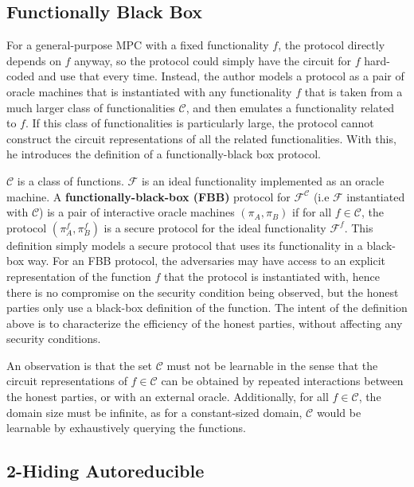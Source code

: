\documentclass[11pt]{article}
\theoremstyle{theorem}
\theoremstyle{theorem}
\theoremstyle{remark}
\theoremstyle{note}
\theoremstyle{plain}
\theoremstyle{definition}
\begin{document}
\subsection{Functionally Black Box}
For a general-purpose MPC with a fixed functionality $f$, the protocol directly depends on $f$ anyway, so the protocol could simply have the circuit for $f$ hard-coded and use that every time. Instead, the author models a protocol as a pair of oracle machines that is instantiated with any functionality $f$ that is taken from a much larger class of functionalities $\mathcal{C}$, and then emulates a functionality related to $f$. If this class of functionalities is particularly large, the protocol cannot construct the circuit representations of all the related functionalities. With this, he introduces the definition of a functionally-black box protocol.

$\mathcal{C}$ is a class of functions. $\mathcal{F}$ is an ideal functionality implemented as an oracle machine. A \textbf{functionally-black-box (FBB)} protocol for $\mathcal{F}^\mathcal{C}$ (i.e  $\mathcal{F}$ instantiated with $\mathcal{C}$) is a pair of interactive oracle machines $(\pi_A, \pi_B)$  if for all $f \in \mathcal{C}$, the protocol $(\pi^f_A, \pi^f_B)$ is a secure protocol for the ideal functionality $\mathcal{F}^f$. This definition simply models a secure protocol that uses its functionality in a black-box way. For an FBB protocol, the adversaries may have access to an explicit representation of the function $f$ that the protocol is instantiated with, hence there is no compromise on the security condition being observed, but the honest parties only use a black-box definition of the function. The intent of the definition above is to characterize the efficiency of the honest parties, without affecting any security conditions.

An observation is that the set $\mathcal{C}$ must not be learnable in the sense that the circuit representations of  $f \in \mathcal{C}$ can be obtained by repeated interactions between the honest parties, or with an external oracle. Additionally, for all $f \in \mathcal{C}$, the domain size must be infinite, as for a constant-sized domain, $\mathcal{C}$ would be learnable by exhaustively querying the functions.

\subsection{2-Hiding Autoreducible}
\end{document}
